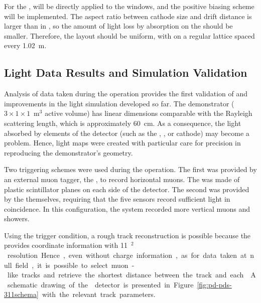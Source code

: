 For the  ,  will be directly applied to the  windows, and the positive biasing scheme will be implemented. The aspect ratio between cathode size and drift distance is larger than in , so the amount of light loss by absorption on the  should be smaller. Therefore, the   layout should be uniform, with  on a regular lattice spaced every \SI{1.02}{m}. 


\subsection{ Light Data Results and Simulation Validation}

Analysis of data taken during the  operation provides the first validation of and improvements in the light simulation developed so far. 
The demonstrator ($3\times1\times1$~m$^3$ active volume) has linear dimensions comparable with the Rayleigh scattering length, which is approximately \SI{60}{\cm}. 
As a consequence, the light absorbed by elements of the detector (such as the , , or cathode) may become a problem.
Hence, light maps were created with particular care for precision in reproducing the demonstrator's geometry.

Two triggering schemes were used during the  operation.
The first was provided by an external muon tagger, the , to record horizontal muons. The  was made of plastic scintillator planes on each side of the detector.
The second was provided by the  themselves, requiring that the five sensors record sufficient light in coincidence. In this configuration, the system recorded more vertical muons and showers.

Using the  trigger condition, a rough track reconstruction is possible because the  provides coordinate information with \SI{11}{\cm$^2$} resolution. Hence, even without charge information, as for data taken at null field, it is possible to select muon-like tracks and retrieve the shortest distance between the track and each . A schematic drawing of the  detector is presented in Figure~\ref{fig:pd-pds-311schema} with the relevant track parameters.


